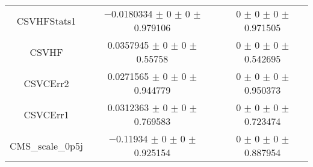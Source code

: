 \begin{table}
\begin{tabular}{ccc}
CSVHFStats1 & \num{-0.0180334} $\pm$ \num{0} $\pm$ \num{0} $\pm$ \num{0.979106} & \num{0} $\pm$ \num{0} $\pm$ \num{0} $\pm$ \num{0.971505}\\
CSVHF & \num{0.0357945} $\pm$ \num{0} $\pm$ \num{0} $\pm$ \num{0.55758} & \num{0} $\pm$ \num{0} $\pm$ \num{0} $\pm$ \num{0.542695}\\
CSVCErr2 & \num{0.0271565} $\pm$ \num{0} $\pm$ \num{0} $\pm$ \num{0.944779} & \num{0} $\pm$ \num{0} $\pm$ \num{0} $\pm$ \num{0.950373}\\
CSVCErr1 & \num{0.0312363} $\pm$ \num{0} $\pm$ \num{0} $\pm$ \num{0.769583} & \num{0} $\pm$ \num{0} $\pm$ \num{0} $\pm$ \num{0.723474}\\
CMS\_scale\_0p5j & \num{-0.11934} $\pm$ \num{0} $\pm$ \num{0} $\pm$ \num{0.925154} & \num{0} $\pm$ \num{0} $\pm$ \num{0} $\pm$ \num{0.887954}\\
\bottomrule
\end{tabular}
\end{table}